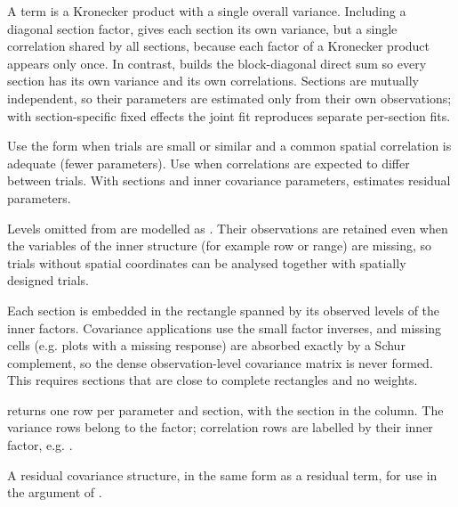 \documentclass[a4paper]{book}
\begin{document}
\begin{Details}\relax
{} A  term is a Kronecker
product with a single overall variance. Including a diagonal section factor,
gives each section its own variance, but a single correlation shared by all
sections, because each factor of a Kronecker product appears only once. In
contrast,  builds the block-diagonal direct sum
so every section has its own variance and its own correlations. Sections are
mutually independent, so their parameters are estimated only from their own
observations; with section-specific fixed effects the joint fit reproduces
separate per-section fits.

 Use the  form when trials are
small or similar and a common spatial correlation is adequate (fewer
parameters). Use  when correlations are expected to differ between
trials. With  sections and  inner covariance parameters,
 estimates  residual parameters.

 Levels omitted from  are modelled as
. Their observations are retained even when the variables of
the inner structure (for example row or range) are missing, so trials without
spatial coordinates can be analysed together with spatially designed trials.

 Each section is embedded in the rectangle spanned by its
observed levels of the inner factors. Covariance applications use the small
factor inverses, and missing cells (e.g. plots with a missing response) are
absorbed exactly by a Schur complement, so the dense observation-level
covariance matrix is never formed. This requires sections that are close to
complete rectangles and no  weights.

  returns one row per parameter
and section, with the section in the  column. The variance rows
belong to the  factor; correlation rows are labelled by their inner
factor, e.g. .
\end{Details}
%
\begin{Value}
A residual covariance structure, in the same form as a residual 
term, for use in the  argument of .
\end{Value}
\end{document}
